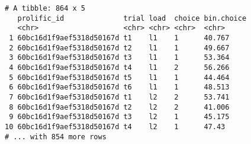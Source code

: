 \documentclass[
]{article}
\begin{document}
\begin{verbatim}
# A tibble: 864 x 5
   prolific_id              trial load  choice bin.choice
   <chr>                    <chr> <chr> <chr>  <chr>     
 1 60bc16d1f9aef5318d50167d t1    l1    1      40.767    
 2 60bc16d1f9aef5318d50167d t2    l1    1      49.667    
 3 60bc16d1f9aef5318d50167d t3    l1    1      53.364    
 4 60bc16d1f9aef5318d50167d t4    l1    2      56.266    
 5 60bc16d1f9aef5318d50167d t5    l1    1      44.464    
 6 60bc16d1f9aef5318d50167d t6    l1    1      48.513    
 7 60bc16d1f9aef5318d50167d t1    l2    2      53.741    
 8 60bc16d1f9aef5318d50167d t2    l2    2      41.006    
 9 60bc16d1f9aef5318d50167d t3    l2    1      45.175    
10 60bc16d1f9aef5318d50167d t4    l2    1      47.43     
# ... with 854 more rows
\end{verbatim}
\end{document}
